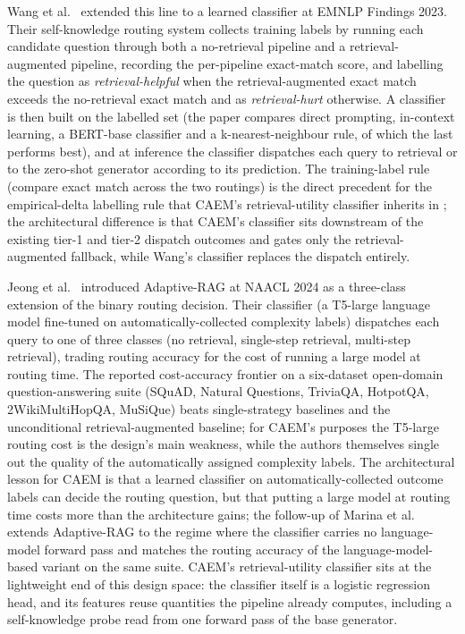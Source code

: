 Wang et al.~\cite{wang2023skr} extended this line to a learned classifier at EMNLP Findings 2023. Their self-knowledge routing system collects training labels by running each candidate question through both a no-retrieval pipeline and a retrieval-augmented pipeline, recording the per-pipeline exact-match score, and labelling the question as \emph{retrieval-helpful} when the retrieval-augmented exact match exceeds the no-retrieval exact match and as \emph{retrieval-hurt} otherwise. A classifier is then built on the labelled set (the paper compares direct prompting, in-context learning, a BERT-base classifier and a k-nearest-neighbour rule, of which the last performs best), and at inference the classifier dispatches each query to retrieval or to the zero-shot generator according to its prediction. The training-label rule (compare exact match across the two routings) is the direct precedent for the empirical-delta labelling rule that CAEM's retrieval-utility classifier inherits in ; the architectural difference is that CAEM's classifier sits downstream of the existing tier-1 and tier-2 dispatch outcomes and gates only the retrieval-augmented fallback, while Wang's classifier replaces the dispatch entirely.

Jeong et al.~\cite{jeong2024adaptive} introduced Adaptive-RAG at NAACL 2024 as a three-class extension of the binary routing decision. Their classifier (a T5-large language model fine-tuned on automatically-collected complexity labels) dispatches each query to one of three classes (no retrieval, single-step retrieval, multi-step retrieval), trading routing accuracy for the cost of running a large model at routing time. The reported cost-accuracy frontier on a six-dataset open-domain question-answering suite (SQuAD, Natural Questions, TriviaQA, HotpotQA, 2WikiMultiHopQA, MuSiQue) beats single-strategy baselines and the unconditional retrieval-augmented baseline; for CAEM's purposes the T5-large routing cost is the design's main weakness, while the authors themselves single out the quality of the automatically assigned complexity labels. The architectural lesson for CAEM is that a learned classifier on automatically-collected outcome labels can decide the routing question, but that putting a large model at routing time costs more than the architecture gains; the follow-up of Marina et al.~\cite{moskvoretskii2025llm} extends Adaptive-RAG to the regime where the classifier carries no language-model forward pass and matches the routing accuracy of the language-model-based variant on the same suite. CAEM's retrieval-utility classifier sits at the lightweight end of this design space: the classifier itself is a logistic regression head, and its features reuse quantities the pipeline already computes, including a self-knowledge probe read from one forward pass of the base generator.

